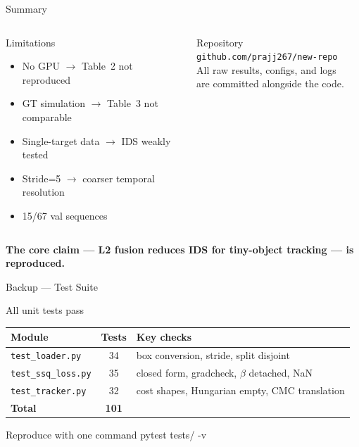 \documentclass[aspectratio=169, 10pt]{beamer}
\begin{document}
\begin{frame}{Summary}
\begin{columns}[T]
    \begin{alertblock}{Limitations}
      \begin{itemize}
        \item No GPU $\to$ Table~2 not reproduced
        \item GT simulation $\to$ Table~3 not comparable
        \item Single-target data $\to$ IDS weakly tested
        \item Stride=5 $\to$ coarser temporal resolution
        \item 15/67 val sequences
      \end{itemize}
    \end{alertblock}

    \vspace{0.6em}

    \begin{block}{Repository}
      \centering
      \texttt{github.com/prajj267/new-repo}\\
      \vspace{0.3em}
      \small All raw results, configs, and logs\\
      are committed alongside the code.
    \end{block}

  \end{columns}

  \vspace{0.5em}
  \centering
  \textbf{\large The core claim — L2 fusion reduces IDS for tiny-object tracking — is reproduced.}

\end{frame}

\begin{frame}[plain]{Backup — Test Suite}
  \centering
  \vspace{1em}
  \begin{block}{\centering All unit tests pass}
    \centering
    \begin{tabular}{lcl}
      \toprule
      Module & Tests & Key checks \\
      \midrule
      \texttt{test\_loader.py} & 34 & box conversion, stride, split disjoint \\
      \texttt{test\_ssq\_loss.py} & 35 & closed form, gradcheck, $\beta$ detached, NaN \\
      \texttt{test\_tracker.py} & 32 & cost shapes, Hungarian empty, CMC translation \\
      \midrule
      \textbf{Total} & \textbf{101} & \\
      \bottomrule
    \end{tabular}
  \end{block}

  \vspace{1em}
  \begin{block}{\centering Reproduce with one command}
    \centering\ttfamily pytest tests/ -v
  \end{block}
\end{frame}

\end{document}
